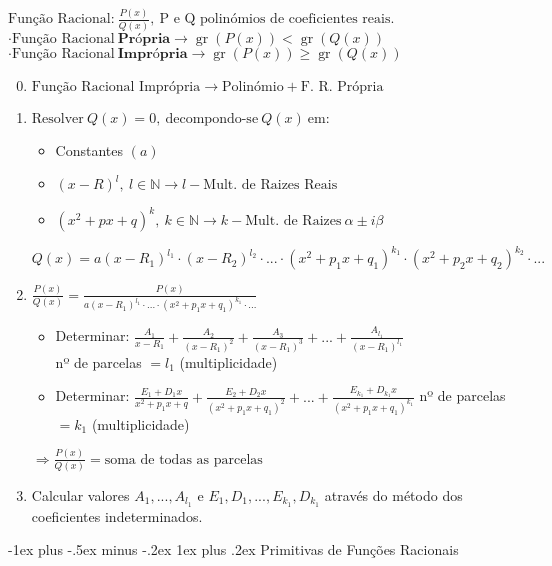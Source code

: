 \documentclass[10pt,landscape]{article}
\makeatletter
\DeclareMathOperator{\gr}{gr}
\renewcommand{\subsubsection}{\@startsection{subsubsection}{3}{0mm}%
                                {-1ex plus -.5ex minus -.2ex}%
                                {1ex plus .2ex}%
                                {\normalfont\small\bfseries}}
\makeatother
\begin{document}
\begin{multicols}{3}
$\text{Função Racional:}\ \frac{P(x)}{Q(x)},\ \text{P e Q polinómios de coeficientes reais.}$\\
$\cdot \text{Função Racional}\ \textbf{Própria} \to \gr(P(x)) < \gr(Q(x))$\\
$\cdot \text{Função Racional}\ \textbf{Imprópria} \to \gr(P(x)) \geq \gr(Q(x))$\\
\begin{enumerate}\setcounter{enumi}{-1}
\item $\text{Função Racional Imprópria} \to \text{Polinómio} + \text{F. R. Própria}$\\
\item $\text{Resolver}\ Q(x)=0,\ \text{decompondo-se}\ Q(x)\ \text{em}:$\\
\begin{itemize}\renewcommand{\labelitemi}{$-$}
\item Constantes $(a)$
\item $(x-R)^l,\ l \in \mathbb{N} \to l - \text{Mult. de Raizes Reais}$
\item $(x^2 + px + q)^k,\ k \in \mathbb{N} \to k - \text{Mult. de Raizes}\ \alpha \pm i\beta$
\end{itemize}
$Q(x) = a(x-R_1)^{l_1} \cdot (x-R_2)^{l_2} \cdot ... \cdot (x^2 + p_1x + q_1)^{k_1} \cdot (x^2+p_2x+q_2)^{k_2} \cdot ...$
\item $\frac{P(x)}{Q(x)} = \frac{P(x)}{a(x-R_1)^{l_1} \cdot ... \cdot (x^2 + p_1x + q_1)^{k_1} \cdot ...}$
\begin{itemize}\renewcommand{\labelitemi}{$-$}
\item Determinar: $\frac{A_1}{x-R_1}+\frac{A_2}{(x-R_1)^2}+\frac{A_3}{(x-R_1)^3}+...+	\frac{A_{l_1}}{(x-R_1)^{l_1}}$\\
nº de parcelas $= l_1$ (multiplicidade)
\item Determinar: $\frac{E_1+D_1x}{x^2+p_1x+q}+\frac{E_2+D_2x}{(x^2+p_1x+q_1)^2}+...+\frac{E_{k_1}+D_{k_1}x}{(x^2+p_1x+q_1)^{k_1}}$
nº de parcelas $= k_1$ (multiplicidade)
\end{itemize}
$\Longrightarrow \frac{P(x)}{Q(x)} = \text{soma de todas as parcelas}$\\
\item Calcular valores $A_1, ..., A_{l_1}$ e $E_1, D_1, ..., E_{k_1}, D_{k_1}$ através do método dos coeficientes indeterminados.
\end{enumerate}

\subsubsection{Primitivas de Funções Racionais}


\end{multicols}
\end{document}
